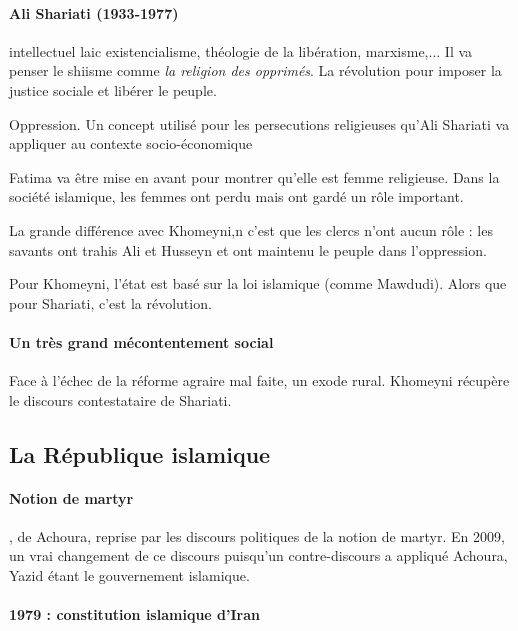    \paragraph{Ali Shariati (1933-1977)} intellectuel laic  existencialisme, théologie de la libération, marxisme,...
   Il va penser le shiisme comme \textit{la religion des opprimés}. La révolution pour imposer la justice sociale et libérer le peuple.
   \begin{Def}
   Oppression. Un concept utilisé pour les persecutions religieuses qu'Ali Shariati va appliquer au contexte socio-économique
   \end{Def}
   Fatima va être mise en avant pour montrer qu'elle est femme religieuse. Dans la société islamique, les femmes ont perdu mais ont gardé un rôle important.
   
   La grande différence avec Khomeyni,n c'est que les clercs n'ont aucun rôle : les savants ont trahis Ali et Husseyn et ont maintenu le peuple dans l'oppression.
   
   Pour Khomeyni, l'état est basé sur la loi islamique (comme Mawdudi). Alors que pour Shariati, c'est la révolution.
   
   \paragraph{Un très grand mécontentement social} Face à l'échec de la réforme agraire mal faite, un exode rural. Khomeyni récupère le discours contestataire de Shariati. 
   

   
 \subsection{ La République islamique}
     
     
\paragraph{Notion de martyr}    , de Achoura, reprise par les discours politiques de la notion de martyr. 
   En 2009, un vrai changement de ce discours puisqu'un contre-discours a appliqué Achoura,  Yazid étant le gouvernement islamique.
   
   
\paragraph{1979 : constitution islamique d'Iran}   
    

